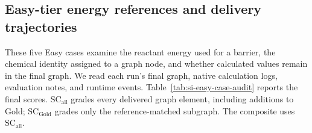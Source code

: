 \subsection{Easy-tier energy references and delivery trajectories}
\label{sec:si-easy-case-audit}

These five Easy cases examine the reactant energy used for a barrier, the chemical identity assigned to a graph node, and whether calculated values remain in the final graph. We read each run's final graph, native calculation logs, evaluation notes, and runtime events. Table~\ref{tab:si-easy-case-audit} reports the final scores. $\mathrm{SC}_{\mathrm{all}}$ grades every delivered graph element, including additions to Gold; $\mathrm{SC}_{\mathrm{Gold}}$ grades only the reference-matched subgraph. The composite uses $\mathrm{SC}_{\mathrm{all}}$.

